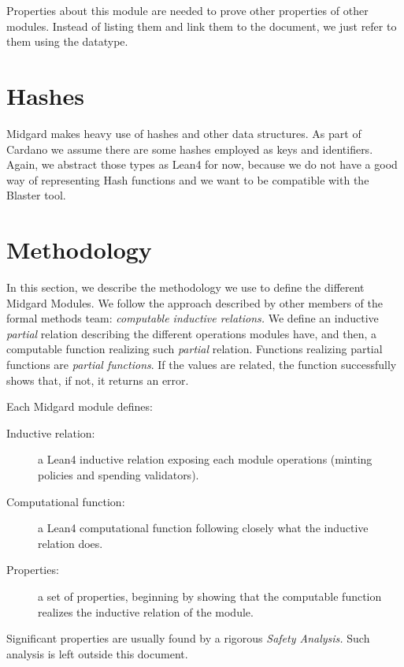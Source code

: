 Properties about this module are needed to prove other properties of other
modules.
%
Instead of listing them and link them to the document, we just refer to them
using the datatype.


\section{Hashes}
%
Midgard makes heavy use of hashes and other data structures.
%
As part of Cardano we assume there are some hashes employed as keys and identifiers.
%
Again, we abstract those types as Lean4  for now, because we do not
have a good way of representing Hash functions and we want to be compatible with
the Blaster tool.


\section{Methodology}

In this section, we describe the methodology we use to define the different
Midgard Modules.
%
We follow the approach described by other members of the formal methods team:
\emph{computable inductive relations.}
%
We define an inductive \emph{partial} relation describing the different
operations modules have, and then, a computable function realizing
such \emph{partial} relation.
%
Functions realizing partial functions are \emph{partial functions}.
%
If the values are related, the function successfully shows that, if not, it
returns an error.

Each Midgard module defines:
%
\begin{description}
    \item[Inductive relation:] a Lean4 inductive relation exposing each module
        operations (minting policies and spending validators).
    \item[Computational function:] a Lean4 computational function following
        closely what the inductive relation does.
    \item[Properties:] a set of properties, beginning by showing that the
        computable function realizes the inductive relation of the module.
\end{description}

Significant properties are usually found by a rigorous \emph{Safety Analysis.}
%
Such analysis is left outside this document.

